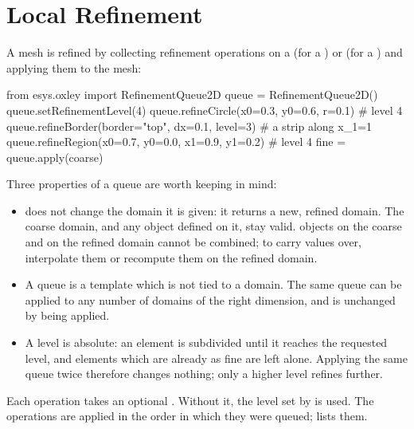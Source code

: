 \section{Local Refinement}\label{sec:oxley:refinement}
A mesh is refined by collecting refinement operations on a
 (for a ) or
 (for a ) and applying them to the
mesh:
\begin{python}
from esys.oxley import RefinementQueue2D
queue = RefinementQueue2D()
queue.setRefinementLevel(4)
queue.refineCircle(x0=0.3, y0=0.6, r=0.1)            # level 4
queue.refineBorder(border="top", dx=0.1, level=3)    # a strip along x_1=1
queue.refineRegion(x0=0.7, y0=0.0, x1=0.9, y1=0.2)   # level 4
fine = queue.apply(coarse)
\end{python}
Three properties of a queue are worth keeping in mind:
\begin{itemize}
\item {} does not change the domain it is given: it returns a new,
refined domain. The coarse domain, and any \Data object defined on it, stay
valid. \Data objects on the coarse and on the refined domain cannot be
combined; to carry values over, interpolate them or recompute them on the
refined domain.
\item A queue is a template which is not tied to a domain. The same queue can
be applied to any number of domains of the right dimension, and is unchanged
by being applied.
\item A level is absolute: an element is subdivided until it reaches the
requested level, and elements which are already as fine are left alone.
Applying the same queue twice therefore changes nothing; only a higher level
refines further.
\end{itemize}
Each operation takes an optional . Without it, the level set by
 is used. The operations are applied in the order
in which they were queued;  lists them.

